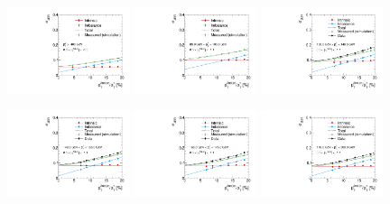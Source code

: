\begin{figure}[!h]
 \centering
    \includegraphics[width=0.32\textwidth]{figures/resolution/results/JER_for_1_eta_bin_12_pTGamma_bin_all_contributions_PFCHS_RMS99_mc.pdf}
    \includegraphics[width=0.32\textwidth]{figures/resolution/results/JER_for_2_eta_bin_4_pTGamma_bin_all_contributions_PFCHS_RMS99_mc.pdf}
    \includegraphics[width=0.32\textwidth]{figures/resolution/results/JER_for_2_eta_bin_5_pTGamma_bin_all_contributions_PFCHS_RMS99_mc.pdf}

    \includegraphics[width=0.32\textwidth]{figures/resolution/results/JER_for_2_eta_bin_6_pTGamma_bin_all_contributions_PFCHS_RMS99_mc.pdf}
    \includegraphics[width=0.32\textwidth]{figures/resolution/results/JER_for_2_eta_bin_7_pTGamma_bin_all_contributions_PFCHS_RMS99_mc.pdf}
    \includegraphics[width=0.32\textwidth]{figures/resolution/results/JER_for_2_eta_bin_8_pTGamma_bin_all_contributions_PFCHS_RMS99_mc.pdf}


\end{figure}
